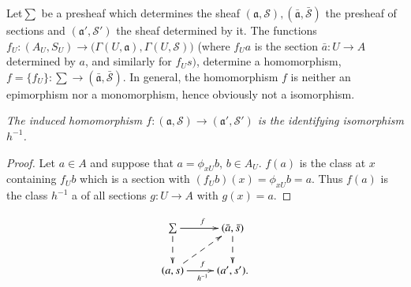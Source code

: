 Let\pageoriginale $\sum$ be a presheaf which determines the sheaf
$(\mathfrak{a}, 
\mathscr{S}), (\bar{\mathfrak{a}}, \bar{\mathscr{S}})$ the presheaf of
sections and $(\mathfrak{a}',  
\mathscr{S}')$ the sheaf determined by it. The functions $f_U : (A_U,
S_U) \to \bigg( \Gamma ( U, \mathfrak{a}), \Gamma (U,\mathscr{S})
\bigg)$ (where $f_Ua$ is 
the section $\bar{a} : U \to A$ determined by $a$, and similarly for
$f_Us)$, determine a homomorphism, $f=\{f_U\} : \sum \to (\bar{\mathfrak{a}},
\bar{\mathscr{S}})$. In general, the homomorphism $f$ is neither an
epimorphism nor a monomorphism, hence obviously not a isomorphism. 

\textit {The induced homomorphism $f : (\mathfrak{a},\mathscr{S}) \to
  (\mathfrak{a}',\mathscr{S}')$ is the identifying isomorphism $h^{-1}$.} 

\begin{proof}
Let $a \in A$ and suppose that $a = \phi_{xU} b$, $b \in A_U$. $f(a)$ is
the class at $x$ containing $f_U b$ which is a section with $(f_U b)
(x)= \phi_{xU} b=a$. Thus $f(a)$ is the class $h^{-1}$ a of all
sections $g : U \to A$ with $g(x) = a$. 
\end{proof}
\[
\xymatrix{
\sum \ar[r]^f \ar@{-->}[d] & (\bar{a},\bar{s})\ar@{-->}[d]\\
(a,s) \ar[r]^f_{h^{-1}} \ar@{-->}[ur] & (a',s').
}
\]


